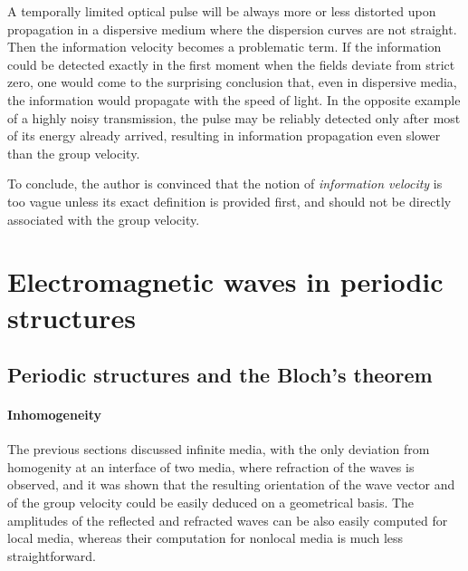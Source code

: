 A temporally limited optical pulse will be always more or less distorted upon propagation in a dispersive medium where the dispersion curves are not straight. Then the information velocity becomes a problematic term. If the information could be detected exactly in the first moment when the fields deviate from strict zero, one would come to the surprising conclusion that, even in dispersive media, the information would propagate with the speed of light. In the opposite example of a highly noisy transmission, the pulse may be reliably detected only after most of its energy already arrived, resulting in information propagation even slower than the group velocity. 

To conclude, the author is convinced that the notion of \textit{information velocity} is too vague unless its exact definition is provided first, and should not be directly associated with the group velocity. 

\section{Electromagnetic waves in periodic structures}%
\subsection{Periodic structures and the Bloch's theorem}
\paragraph{Inhomogeneity}%
The previous sections discussed infinite media, with the only deviation from homogenity at an interface of two media, where refraction of the waves is observed, and it was shown that the resulting orientation of the wave vector and of the group velocity could be easily deduced on a geometrical basis. The amplitudes of the reflected and refracted waves can be also easily computed for local media, whereas their computation for nonlocal media is much less straightforward. 

